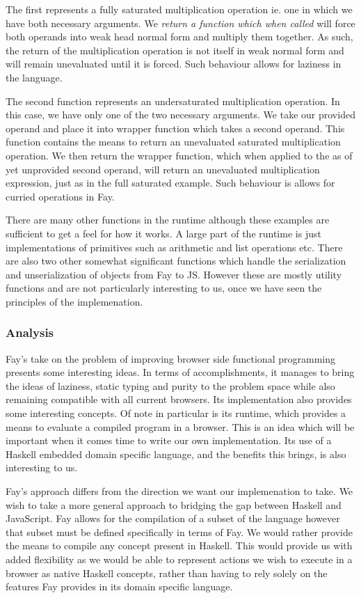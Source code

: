 The first represents a fully saturated multiplication operation ie. one
in which we have both necessary arguments. We \emph{return a function
which when called} will force both operands into weak head normal form
and multiply them together. As such, the return of the multiplication
operation is not itself in weak normal form and will remain unevaluated
until it is forced. Such behaviour allows for laziness in the language.

The second function represents an undersaturated multiplication operation.
In this case, we have only one of the two necessary arguments. We take
our provided operand and place it into wrapper function which takes a second
operand. This function contains the means to return an unevaluated
saturated multiplication operation. We then return the wrapper function, 
which when applied to the as of yet unprovided second operand, will return
an unevaluated multiplication expression, just as in the full saturated example.
Such behaviour is allows for curried operations in Fay.

There are many other functions in the runtime although these examples
are sufficient to get a feel for how it works. A large part of the runtime
is just implementations of primitives such as arithmetic and list operations
etc. There are also two other somewhat significant functions which handle
the serialization and unserialization of objects from Fay to JS. However
these are mostly utility functions and are not particularly interesting
to us, once we have seen the principles of the implemenation.

\subsubsection{Analysis}
Fay's take on the problem of improving browser side functional programming
presents some interesting ideas. In terms of accomplishments, it manages
to bring the ideas of laziness, static typing and purity to the problem
space while also remaining compatible with all current browsers. Its
implementation also provides some interesting concepts. Of note in particular
is its runtime, which provides a means to evaluate a compiled program in a
browser. This is an idea which will be important when it comes time to write
our own implementation. Its use of a Haskell embedded domain specific 
language, and the benefits this brings, is also interesting to us.

Fay's approach differs from the direction we want our implemenation to take.
We wish to take a more general approach to bridging the gap between Haskell
and JavaScript. Fay allows for the compilation of a subset of the language
however that subset must be defined specifically in terms of Fay. We would
rather provide the means to compile any concept present in Haskell. This
would provide us with added flexibility as we would be able to represent
actions we wish to execute in a browser as native Haskell concepts, rather
than having to rely solely on the features Fay provides in its domain 
specific language.

